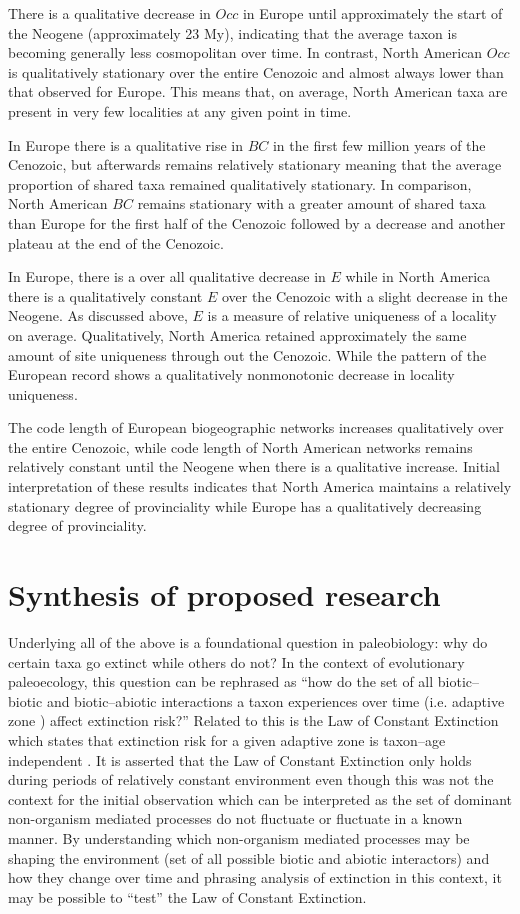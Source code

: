 \documentclass[12pt,letterpaper]{article}
\begin{document}
There is a qualitative decrease in \(Occ\) in Europe until approximately the start of the Neogene (approximately 23 My), indicating that the average taxon is becoming generally less cosmopolitan over time. In contrast, North American \(Occ\) is qualitatively stationary over the entire Cenozoic and almost always lower than that observed for Europe. This means that, on average, North American taxa are present in very few localities at any given point in time.

In Europe there is a qualitative rise in \(BC\) in the first few million years of the Cenozoic, but afterwards remains relatively stationary meaning that the average proportion of shared taxa remained qualitatively stationary. In comparison, North American \(BC\) remains stationary with a greater amount of shared taxa than Europe for the first half of the Cenozoic followed by a decrease and another plateau at the end of the Cenozoic.

In Europe, there is a over all qualitative decrease in \(E\) while in North America there is a qualitatively constant \(E\) over the Cenozoic with a slight decrease in the Neogene. As discussed above, \(E\) is a measure of relative uniqueness of a locality on average. Qualitatively, North America retained approximately the same amount of site uniqueness through out the Cenozoic. While the pattern of the European record shows a qualitatively nonmonotonic decrease in locality uniqueness.

The code length of European biogeographic networks increases qualitatively over the entire Cenozoic, while code length of North American networks remains relatively constant until the Neogene when there is a qualitative increase. Initial interpretation of these results indicates that North America maintains a relatively stationary degree of provinciality while Europe has a qualitatively decreasing degree of provinciality. 


\section{Synthesis of proposed research} \label{sec:synth}
Underlying all of the above is a foundational question in paleobiology: why do certain taxa go extinct while others do not? In the context of evolutionary paleoecology, this question can be rephrased as ``how do the set of all biotic--biotic and biotic--abiotic interactions a taxon experiences over time (i.e. adaptive zone \citealp{Simpson1944}) affect extinction risk?'' Related to this is the Law of Constant Extinction which states that extinction risk for a given adaptive zone is taxon--age independent \citep{VanValen1973}. It is asserted that the Law of Constant Extinction only holds during periods of relatively constant environment even though this was not the context for the initial observation \citep{Liow2007b,VanValen1973} which can be interpreted as the set of dominant non-organism mediated processes do not fluctuate or fluctuate in a known manner. By understanding which non-organism mediated processes may be shaping the environment (set of all possible biotic and abiotic interactors) and how they change over time and phrasing analysis of extinction in this context, it may be possible to ``test'' the Law of Constant Extinction.
\end{document}
